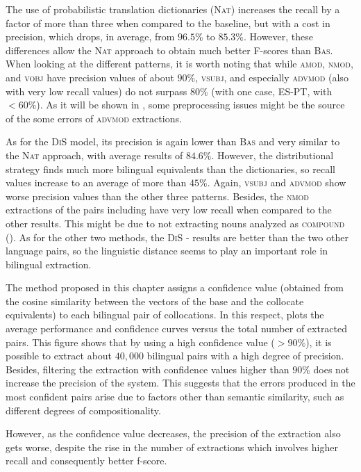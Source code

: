 \documentclass[output=paper
,modfonts
,nonflat]{langsci/langscibook}
\begin{document}
The use of probabilistic translation dictionaries (\textsc{Nat}) increases the recall
by a factor of more than three when compared to the baseline, but with a cost in precision, which drops, in average, from $96.5\%$ to $85.3\%$. However, these differences
allow the \textsc{Nat} approach to obtain much better F-scores than \textsc{Bas}. When looking at the different  patterns, it is worth noting
that while \textsc{amod, nmod}, and \textsc{vobj} have precision values of about $90\%$,
\textsc{vsubj}, and especially \textsc{advmod} (also with very low recall values)
do not surpass $80\%$ (with one case, ES-PT, with $<60\%$). As it will be shown
in , some preprocessing issues might be the source of the some
errors of \textsc{advmod} extractions.

As for the \textsc{DiS} model, its precision is again lower than \textsc{Bas} and very similar
to the \textsc{Nat} approach, with average results of $84.6\%$. However, the distributional
strategy finds much more bilingual equivalents than the dictionaries, so
recall values increase to an average of more than $45\%$. Again, \textsc{vsubj} and
\textsc{advmod} show worse precision values than the other three patterns.
Besides, the \textsc{nmod} extractions of the pairs including  have very low recall
when compared to the other results. This might be due to not extracting nouns analyzed as \textsc{compound} ().
As for the other two methods, the \textsc{DiS} - results are better than the two
other language pairs, so the linguistic distance seems to play an important role in bilingual
 extraction.

The method proposed in this chapter assigns a confidence value (obtained from the cosine
similarity between the vectors of the base and the collocate equivalents)
to each bilingual pair of collocations. In this respect,  plots
the average performance and confidence curves versus the total number of extracted pairs.
This figure shows that by using a high confidence value ($>90\%$), it is possible
to extract about $40,000$ bilingual pairs with a high degree of precision. Besides, filtering the extraction with confidence values higher than
$90\%$ does not increase the precision of the system. 
This suggests that the errors produced in the most confident pairs arise due to factors other than semantic similarity, such as different degrees of compositionality.

However, as the confidence value decreases,
the precision of the extraction also gets worse, despite the rise in the number of extractions
which involves higher recall and consequently better f-score.
\end{document}
